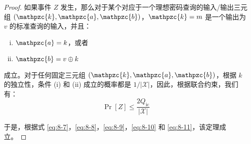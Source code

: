 \begin{proof}
如果事件 $Z$ 发生，那么对于某个对应于一个理想密码查询的输入/输出三元组 $(\mathpzc{k},\mathpzc{a},\mathpzc{b})$，$\mathpzc{k}=m$ 是一个输出为 $v$ 的标准查询的输入，并且：
\begin{enumerate}[(i)]
	\item $\mathpzc{a}=k$，或者
	\item $\mathpzc{b}=v\oplus k$
\end{enumerate}
成立。对于任何固定三元组 $(\mathpzc{k},\mathpzc{a},\mathpzc{b})$，根据 $k$ 的独立性，条件 (i) 和 (ii) 成立的概率都是 $1/|\mathcal{X}|$，因此，根据联合约束，我们有：
\begin{equation}\label{eq:8-11}
\Pr[Z]\leq\frac{2Q_\mathrm{ic}}{|\mathcal{X}|}
\end{equation}

于是，根据式 \ref{eq:8-7}，\ref{eq:8-8}，\ref{eq:8-9}，\ref{eq:8-10} 和 \ref{eq:8-11}，该定理成立。
\end{proof} 